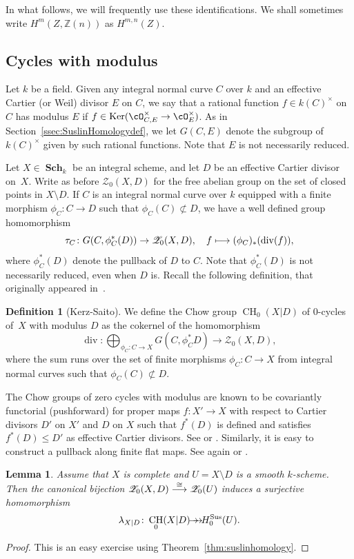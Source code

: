\documentclass[JEP,XML,SOM,Unicode,published]{cedram}
\let\mathcal\mathscr
\def\mto{\mathchoice{\longmapsto}{\mapsto}{\mapsto}{\mapsto}}
\newcommand{\onto}{\mathchoice{\to\hspace*{-5mm}\to}{\hspace*{-.5mm}\to\hspace*{-2.85mm}\to\hspace*{-.5mm}}{\to\hspace*{-3mm}\to}{\to\hspace*{-3mm}\to}}
\def\To#1{\mathchoice{\xrightarrow{\textstyle\kern4pt#1\kern3pt}}{\stackrel{#1}{\longrightarrow}}{}{}}
\let\surj\onto
\newcommand{\sus}{\mathrm{Sus}}
\newtheorem{lem}[thm]{Lemma}
\theoremstyle{definition}
\newtheorem{defn}[thm]{Definition}
\newcommand{\thmref}{Theorem~\ref}
\newcommand{\secref}{Section~\ref}
\newcommand{\sZ}{{\mathcal Z}}
\newcommand{\Z}{{\mathbb Z}}
\DeclareMathOperator{\CH}{CH}
\DeclareMathOperator{\divf}{div}
\DeclareMathOperator{\Ker}{Ker}
\DeclareMathOperator{\Sch}{\mathbf{Sch}}
\begin{document}
In what follows, we will frequently use these identifications.
We shall sometimes write $H^m(Z, \Z(n))$ as $H^{m,n}(Z)$.

\subsection{Cycles with modulus}
Let $k$ be a field. Given any integral normal curve $C$ over $k$ and an effective Cartier (or Weil) divisor $E$ on $C$, we say that a rational function $f\in k(C)^\times$ on $C$ has modulus $E$ if $f\in \Ker(\cO_{C, E}^\times \to \cO_E^\times)$. As in \secref{ssec:SuslinHomologydef}, we let $G(C, E)$ denote the subgroup of $k(C)^\times$ given by such rational functions. Note that $E$ is not necessarily reduced.

Let $X\in \Sch_k$ be an integral scheme, and let $D$ be an effective Cartier divisor on~$X$. Write as before $\sZ_0(X, D)$ for the free abelian group on the set of closed points in $X \setminus D$. If $C$ is an integral normal curve over $k$ equipped with a finite morphism $\phi_C\colon C\to D$ such that $\phi_C(C)\not\subset D$, we have a well defined group homomorphism
\[\tau_C\colon G(C, \phi_C^*(D)) \to \sZ_0(X,D), \quad f\mto (\phi_C)_*(\divf(f)),\]
where $\phi_C^*(D)$ denote the pullback of $D$ to $C$. Note that $\phi_C^*(D)$ is not necessarily reduced, even when $D$ is. Recall the following definition, that originally appeared in~\cite{KS}.

\begin{defn}[Kerz-Saito] We define the Chow group $\CH_0(X|D)$ of $0$-cycles of~$X$ with modulus $D$ as the cokernel of the homomorphism
\[\divf\colon \bigoplus_{\phi_C\colon C\to X}G(C, \phi_C^*D)\to \sZ_0(X,D),\]
where the sum runs over the set of finite morphisms $\phi_C\colon C\to X$ from integral normal curves such that $\phi_C(C)\not\subset D$.
\end{defn}

The Chow groups of zero cycles with modulus are known to be covariantly functorial (pushforward) for proper maps $f\colon X'\to X$ with respect to Cartier divisors $D'$ on $X'$ and $D$ on $X$ such that $f^*(D)$ is defined and satisfies $f^*(D) \leq D'$ as effective Cartier divisors. See \cite[Lem.\,2.4]{BS} or
\cite[Prop.\,2.10]{KPv}. Similarly, it is easy to construct a pullback along finite flat maps. See again \cite[Lem.\,2.4]{BS} or \cite[Prop.\,2.12]{KPv}.

\begin{lem}\label{lem:mod-Suslin} Assume that $X$ is complete and
$U=X \setminus D$ is a smooth $k$-scheme. Then the canonical bijection
$\sZ_0(X,D) \To{\cong} \sZ_0(U)$ induces a surjective homomorphism
\begin{equation}\label{eqn:mod-Suslin}\lambda_{X|D}\colon
\CH_0(X|D)\surj H_0^{\sus}(U).\end{equation}
\end{lem}
\begin{proof}
This is an easy exercise using \thmref{thm:suslinhomology}.
\end{proof}
\end{document}
